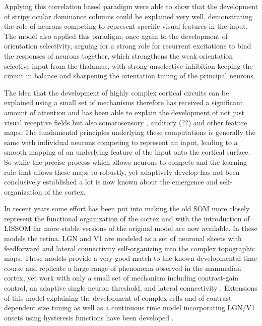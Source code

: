 Applying this correlation based paradigm \cite{Miller1989} were able
to show that the development of stripy ocular dominance columns could
be explained very well, demonstrating the role of neurons competing to
represent specific visual features in the input. The \cite{Somers1995}
model also applied this paradigm, once again to the development of
orientation selectivity, arguing for a strong role for recurrent
excitations to bind the responses of neurons together, which
strengthens the weak orientation selective input from the thalamus,
with strong unselective inhibition keeping the circuit in balance and
sharpening the orientation tuning of the principal neurons.

The idea that the development of highly complex cortical circuits can
be explained using a small set of mechanisms therefore has received a
significant amount of attention and has been able to explain the
development of not just visual receptive fields but also somatosensory
\citep{Wilson2010}, auditory (??) and other feature maps. The
fundamental principles underlying these computations is generally the
same with individual neurons competing to represent an input, leading
to a smooth mapping of an underlying feature of the input onto the
cortical surface. So while the precise process which allows neurons to
compete and the learning rule that allows these maps to robustly, yet
adaptively develop has not been conclusively established a lot is now
known about the emergence and self-organization of the cortex.

In recent years some effort has been put into making the old SOM more
closely represent the functional organization of the cortex and with
the introduction of LISSOM \citep{Bednar2003} far more stable versions
of the original model are now available. In these models the retina,
LGN and V1 are modeled as a set of neuronal sheets with feedforward
and lateral connectivity self-organizing into the complex topographic
maps. These models provide a very good match to the known
developmental time course and replicate a large range of phenomena
observed in the mammalian cortex, yet work with only a small set of
mechanism including contrast-gain control, an adaptive single-neuron
threshold, and lateral connectivity \citep{Stevens2013}. Extensions of
this model explaining the development of complex cells and of contrast
dependent size tuning \citep{Antolik2011} as well as a continuous time
model incorporating LGN/V1 onsets using hysteresis functions have been
developed \citep{Stevens2011}.

